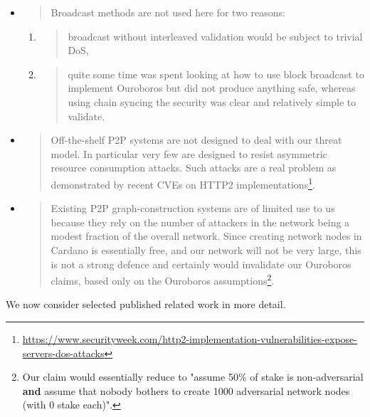 \documentclass[]{article}
\begin{document}
\begin{itemize}
\item
  \begin{quote}
  Broadcast methods are not used here for two reasons:
  \end{quote}

  \begin{enumerate}
  \def\labelenumi{\alph{enumi}.}
  \item
    \begin{quote}
    broadcast without interleaved validation would be subject to trivial
    DoS,
    \end{quote}
  \item
    \begin{quote}
    quite some time was spent looking at how to use block broadcast to
    implement Ouroboros but did not produce anything safe, whereas using
    chain syncing the security was clear and relatively simple to
    validate.
    \end{quote}
  \end{enumerate}
\item
  \begin{quote}
  Off-the-shelf P2P systems are not designed to deal with our threat
  model. In particular very few are designed to resist asymmetric
  resource consumption attacks. Such attacks are a real problem as
  demonstrated by recent CVEs on HTTP2 implementations\footnote{\href{https://www.securityweek.com/http2-implementation-vulnerabilities-expose-servers-dos-attacks}{{https://www.securityweek.com/http2-implementation-vulnerabilities-expose-servers-dos-attacks}}}.
  \end{quote}
\item
  \begin{quote}
  Existing P2P graph-construction systems are of limited use to us
  because they rely on the number of attackers in the network being a
  modest fraction of the overall network. Since creating network nodes
  in Cardano is essentially free, and our network will not be very
  large, this is not a strong defence and certainly would invalidate our
  Ouroboros claims, based only on the Ouroboros assumptions\footnote{Our
    claim would essentially reduce to "assume 50\% of stake is
    non-adversarial \textbf{and} assume that nobody bothers to create
    1000 adversarial network nodes (with 0 stake each)".}.
  \end{quote}
\end{itemize}

We now consider selected published related work in more detail.
\end{document}
